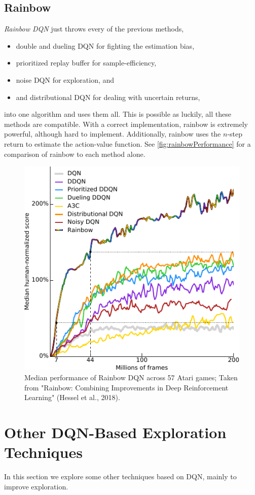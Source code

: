 		\subsection{Rainbow}
			\emph{Rainbow \ac{DQN}} just throws every of the previous methods,
			\begin{itemize}
				\item double and dueling \ac{DQN} for fighting the estimation bias,
				\item prioritized replay buffer for sample-efficiency,
				\item noise \ac{DQN} for exploration, and
				\item and distributional \ac{DQN} for dealing with uncertain returns,
			\end{itemize}
			into one algorithm and uses them all. This is possible as luckily, all these methods are compatible. With a correct implementation, rainbow is extremely powerful, although hard to implement. Additionally, rainbow uses the \(n\)-step return to estimate the action-value function. See \autoref{fig:rainbowPerformance} for a comparison of rainbow to each method alone.

			\begin{figure}
				\centering
				\includegraphics[width=0.5\linewidth]{figures/rainbow-dqn.pdf}
				\caption[Performance of Rainbow \acs{DQN}]{Median performance of Rainbow \acs{DQN} across 57 Atari games; Taken from "Rainbow: Combining Improvements in Deep Reinforcement Learning" (Hessel et al., 2018).}
				\label{fig:rainbowPerformance}
			\end{figure}

	\section{Other \acs{DQN}-Based Exploration Techniques}
		In this section we explore some other techniques based on \ac{DQN}, mainly to improve exploration.

